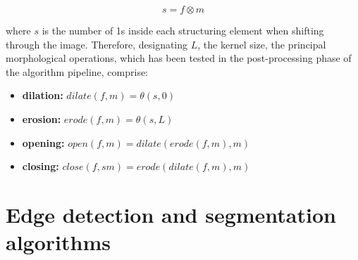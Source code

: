 \begin{equation}
	\label{eqn:morph-convol}
	s = f \otimes m
\end{equation}

where $s$ is the number of 1s inside each structuring element when shifting through the image.
Therefore, designating $L$, the kernel size, the principal morphological operations, which has been tested in the post-processing phase of the algorithm pipeline, comprise:
\begin{itemize}
	\item \textbf{dilation: } $\mathit{dilate}(f,m) = \theta(s, 0)$
	\item \textbf{erosion: } $\mathit{erode}(f,m) = \theta(s, L)$
	\item \textbf{opening: } $\mathit{open}(f,m) = \mathit{dilate}(\mathit{erode}(f, m), m)$
	\item \textbf{closing: } $\mathit{close}(f,sm) = \mathit{erode}(\mathit{dilate}(f, m), m)$
\end{itemize}

\section{Edge detection and segmentation algorithms}
\label{section:edge-detect-and-segment}

